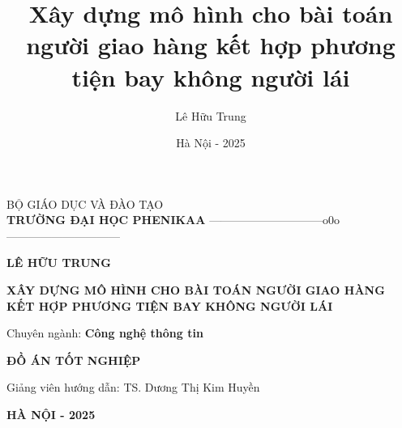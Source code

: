 \thisfancypage{\setlength{\fboxsep}{0.2cm}\setlength{\fboxrule}{1pt}\doublebox}{}
\begin{titlepage}
\begin{center}
	\large
	BỘ GIÁO DỤC VÀ ĐÀO TẠO\\
	{\bf TRƯỜNG ĐẠI HỌC PHENIKAA}
	{——————————o0o——————————}  
\end{center}
\vspace{2cm}
\begin{center}
	\large {\bf LÊ HỮU TRUNG} 
\end{center}
\vspace{2.5cm}
\begin{center}
	\bf\Large XÂY DỰNG MÔ HÌNH CHO BÀI TOÁN NGƯỜI GIAO HÀNG KẾT HỢP PHƯƠNG TIỆN BAY KHÔNG NGƯỜI LÁI
\end{center}
\vspace{0.7cm}

\begin{center}
	Chuyên ngành: {\bf Công nghệ thông tin}
	\\
\end{center}	
\vspace{0.7cm}

\begin{center}
	\large \bf ĐỒ ÁN TỐT NGHIỆP
\end{center}

\vspace{0.5cm}
\begin{center}
	Giảng viên hướng dẫn: TS. Dương Thị Kim Huyền
\end{center}
\vspace{2.6cm}
\begin{center}
	\large {\bf HÀ NỘI - 2025}
\end{center}
 \end{titlepage}

\title{Xây dựng mô hình cho bài toán người giao hàng kết hợp phương tiện bay không người lái}
\author{Lê Hữu Trung}
\date{Hà Nội - 2025}